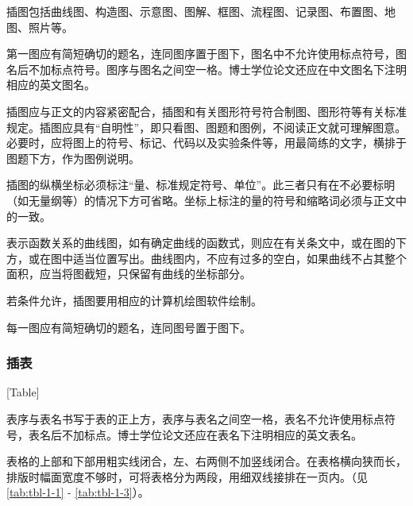 插图包括曲线图、构造图、示意图、图解、框图、流程图、记录图、布置图、地图、照片等。

第一图应有简短确切的题名，连同图序置于图下，图名中不允许使用标点符号，图名后不加标点符号。图序与图名之间空一格。博士学位论文还应在中文图名下注明相应的英文图名。

插图应与正文的内容紧密配合，插图和有关图形符号符合制图、图形符等有关标准规定。插图应具有“自明性”，即只看图、图题和图例，不阅读正文就可理解图意。必要时，应将图上的符号、标记、代码以及实验条件等，用最简练的文字，横排于图题下方，作为图例说明。

插图的纵横坐标必须标注“量、标准规定符号、单位”。此三者只有在不必要标明（如无量纲等）的情况下方可省略。坐标上标注的量的符号和缩略词必须与正文中的一致。

表示函数关系的曲线图，如有确定曲线的函数式，则应在有关条文中，或在图的下方，或在图中适当位置写出。曲线图内，不应有过多的空白，如果曲线不占其整个面积，应当将图截短，只保留有曲线的坐标部分。

若条件允许，插图要用相应的计算机绘图软件绘制。

每一图应有简短确切的题名，连同图号置于图下。

\subsubsection{插表}[Table]

表序与表名书写于表的正上方，表序与表名之间空一格，表名不允许使用标点符号，表名后不加标点。博士学位论文还应在表名下注明相应的英文表名。

表格的上部和下部用粗实线闭合，左、右两侧不加竖线闭合。在表格横向狭而长，排版时幅面宽度不够时，可将表格分为两段，用细双线接排在一页内。（见\ref{tab:tbl-1-1} - \ref{tab:tbl-1-3}）。

